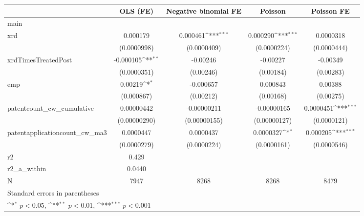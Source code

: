 {
\def\sym#1{\ifmmode^{#1}\else\(^{#1}\)\fi}
\begin{tabular}{l*{4}{c}}
\hline\hline
            &\multicolumn{1}{c}{OLS (FE)}&\multicolumn{1}{c}{Negative binomial FE}&\multicolumn{1}{c}{Poisson}&\multicolumn{1}{c}{Poisson FE}\\
\hline
main        &                     &                     &                     &                     \\
xrd         &    0.000179         &    0.000461\sym{***}&    0.000290\sym{***}&   0.0000318         \\
            & (0.0000998)         & (0.0000409)         & (0.0000224)         & (0.0000444)         \\
[1em]
xrdTimesTreatedPost&   -0.000105\sym{**} &    -0.00246         &    -0.00227         &    -0.00349         \\
            & (0.0000351)         &   (0.00246)         &   (0.00184)         &   (0.00283)         \\
[1em]
emp         &     0.00219\sym{*}  &   -0.000657         &    0.000843         &     0.00388         \\
            &  (0.000867)         &   (0.00212)         &   (0.00168)         &   (0.00275)         \\
[1em]
patentcount\_cw\_cumulative&  0.00000442         & -0.00000211         & -0.00000165         &   0.0000451\sym{***}\\
            &(0.00000290)         &(0.00000155)         &(0.00000127)         & (0.0000121)         \\
[1em]
patentapplicationcount\_cw\_ma3&   0.0000447         &   0.0000437         &   0.0000327\sym{*}  &    0.000205\sym{***}\\
            & (0.0000279)         & (0.0000224)         & (0.0000161)         & (0.0000546)         \\
\hline
r2          &       0.429         &                     &                     &                     \\
r2\_a\_within &      0.0440         &                     &                     &                     \\
N           &        7947         &        8268         &        8268         &        8479         \\
\hline\hline
\multicolumn{5}{l}{\footnotesize Standard errors in parentheses}\\
\multicolumn{5}{l}{\footnotesize \sym{*} \(p<0.05\), \sym{**} \(p<0.01\), \sym{***} \(p<0.001\)}\\
\end{tabular}
}
